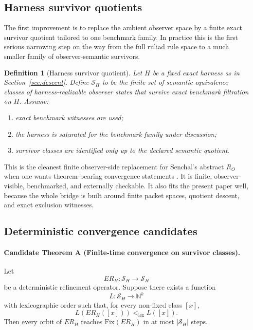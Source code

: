 \documentclass[11pt]{article}
\newtheorem{definition}[theorem]{Definition}
\theoremstyle{remark}
\theoremstyle{plain}
\begin{document}
\subsection{Harness survivor quotients}

The first improvement is to replace the ambient observer space by a finite exact survivor quotient tailored to one benchmark family. In practice this is the first serious narrowing step on the way from the full ruliad rule space to a much smaller family of observer-semantic survivors.

\begin{definition}[Harness survivor quotient]
Let \(H\) be a fixed exact harness as in Section~\ref{sec:descent}. Define \(\mathcal S_H\) to be the finite set of semantic equivalence classes of harness-realizable observer states that survive exact benchmark filtration on \(H\). Assume:
\begin{enumerate}[leftmargin=2em]
\item exact benchmark witnesses are used;
\item the harness is saturated for the benchmark family under discussion;
\item survivor classes are identified only up to the declared semantic quotient.
\end{enumerate}
\end{definition}

This is the cleanest finite observer-side replacement for Senchal's abstract \(R_O\) when one wants theorem-bearing convergence statements \cite{senchal2025}. It is finite, observer-visible, benchmarked, and externally checkable. It also fits the present paper well, because the whole bridge is built around finite packet spaces, quotient descent, and exact exclusion witnesses.

\subsection{Deterministic convergence candidates}

\paragraph{Candidate Theorem A (Finite-time convergence on survivor classes).}
Let
\[
ER_H:\mathcal S_H\to \mathcal S_H
\]
be a deterministic refinement operator. Suppose there exists a function
\[
L:\mathcal S_H\to \mathbb N^k
\]
with lexicographic order such that, for every non-fixed class \([x]\),
\[
L(ER_H([x]))<_{\mathrm{lex}}L([x]).
\]
Then every orbit of \(ER_H\) reaches \(\mathrm{Fix}(ER_H)\) in at most \(|\mathcal S_H|\) steps.
\end{document}
